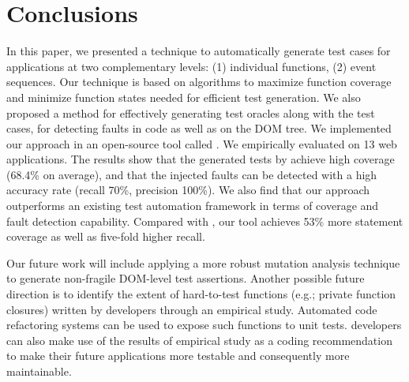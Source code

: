 \section{Conclusions} \label{Sec:concs}

In this paper, we presented a technique  to automatically generate  test cases for \javascript applications at two complementary levels: (1) individual \javascript functions, (2) event sequences. 
Our technique is based on algorithms to maximize function coverage and minimize function states needed for efficient test generation.
We also proposed a method for effectively generating test oracles along with the test cases, for detecting faults in \javascript code as well as on the DOM tree. We implemented our  approach in an open-source tool called \tool. We empirically evaluated \tool on 13 web applications. The results show that the generated tests by \tool achieve high coverage (68.4\% on average),  and that the injected faults can be detected with a high accuracy rate (recall 70\%, precision 100\%).
We also find that our approach outperforms an existing \javascript test automation framework in terms of coverage and fault detection capability. Compared with \artemis, our tool achieves 53\% more statement coverage as well as five-fold higher recall.

Our future work will include applying a more robust mutation analysis technique to generate non-fragile DOM-level test assertions.
Another possible future direction is to identify the extent of hard-to-test functions (e.g.; private function closures) written by \javascript developers through an empirical study. Automated code refactoring systems can be used to expose such functions to unit tests. \javascript developers can also make use of the results of empirical study as a coding recommendation to make their future applications more testable and consequently more maintainable.
 